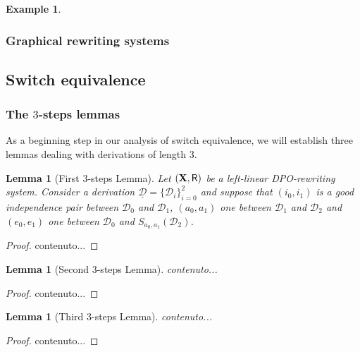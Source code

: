 \documentclass[a4paper]{article}
\def\R{\mathsf{R}}
\def\X{\textbf {\textup{X}}}
\newcommand{\dder}[1]{\mathscr{#1}}
\newcommand{\der}[1]{\underline{\dder{#1}}}
\newtheorem{lemma}[theorem]{Lemma}
\theoremstyle{definition}
\newtheorem{example}[theorem]{Example}
\begin{document}
\begin{example}\label{ex:contro}
\end{example}



\subsubsection{Graphical rewriting systems}\label{subsubsec:graphical}


\subsection{Switch equivalence}

\subsubsection{The $3$-steps lemmas} 

As a beginning step in our analysis of switch equivalence, we will establish three lemmas  dealing with derivations of length $3$. 


\begin{lemma}[First $3$-steps Lemma]\label{lem:primo}
Let $(\X,\R)$ be a left-linear DPO-rewriting system. Consider a derivation $\der{D}=\{\dder{D}_i\}_{i=0}^2$ and suppose that $(i_0,i_1)$ is a good independence pair between $\dder{D}_0$ and $\dder{D}_1$, $(a_0,a_1)$ one between $\dder{D}_1$ and $\dder{D}_2$ and $(e_0, e_1)$ one between $\dder{D}_0$ and $S_{a_0,a_1}(\dder{D}_2)$.
\end{lemma}
\begin{proof}
	contenuto...
\end{proof}


\begin{lemma}[Second $3$-steps Lemma]\label{lem:secondo}
	contenuto...
\end{lemma}
\begin{proof}
	contenuto...
\end{proof}



\begin{lemma}[Third $3$-steps Lemma]\label{lem:terzo}
	contenuto...
\end{lemma}
\begin{proof}
	contenuto...
\end{proof}
\end{document}
